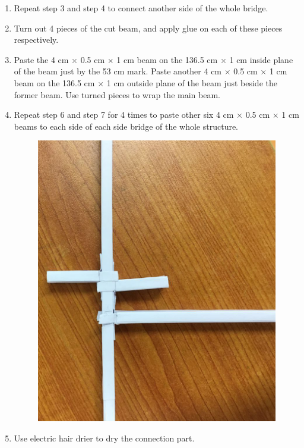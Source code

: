 \begin{enumerate}
\begin{enumerate}
	\item Repeat step 3 and step 4 to connect another side of the whole bridge.
	\item Turn out 4 pieces of the cut beam, and apply glue on each of these pieces respectively. 
	\item Paste the 4 cm $\times$ 0.5 cm $\times$ 1 cm beam on the 136.5 cm  $\times$ 1 cm inside plane of the beam just by the 53 cm mark. Paste another 4 cm $\times$ 0.5 cm $\times$ 1 cm beam on the 136.5 cm  $\times$ 1 cm outside plane of the beam just beside the former beam. Use turned pieces to wrap the main beam. 
	\item Repeat step 6 and step 7 for 4 times to paste other six 4 cm $\times$ 0.5 cm $\times$ 1 cm beams to each side of each side bridge of the whole structure. 
	\begin{figure}[H]
	\begin{center}
	\includegraphics[width = 10 cm]{figure/procedureBridge/p6}
	\end{center}
	\end{figure}
	\item Use electric hair drier to dry the connection part. 
	\end{enumerate}
\end{enumerate}

%
%

